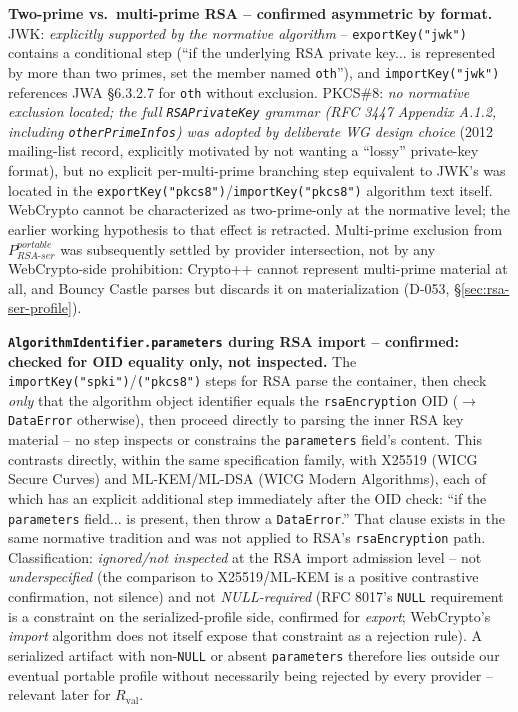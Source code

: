 \documentclass[11pt,a4paper]{article}
\begin{document}
\textbf{Two-prime vs.\ multi-prime RSA -- confirmed asymmetric by format.} JWK: \emph{explicitly supported by the normative algorithm} -- \texttt{exportKey("jwk")} contains a conditional step (``if the underlying RSA private key... is represented by more than two primes, set the member named \texttt{oth}''), and \texttt{importKey("jwk")} references JWA \S6.3.2.7 for \texttt{oth} without exclusion. PKCS\#8: \emph{no normative exclusion located; the full \texttt{RSAPrivateKey} grammar (RFC 3447 Appendix A.1.2, including \texttt{otherPrimeInfos}) was adopted by deliberate WG design choice} (2012 mailing-list record, explicitly motivated by not wanting a ``lossy'' private-key format), but no explicit per-multi-prime branching step equivalent to JWK's was located in the \texttt{exportKey("pkcs8")}/\texttt{importKey("pkcs8")} algorithm text itself. WebCrypto cannot be characterized as two-prime-only at the normative level; the earlier working hypothesis to that effect is retracted. Multi-prime exclusion from $P_{RSA\text{-}ser}^{portable}$ was subsequently settled by provider intersection, not by any WebCrypto-side prohibition: Crypto++ cannot represent multi-prime material at all, and Bouncy Castle parses but discards it on materialization (D-053, \S\ref{sec:rsa-ser-profile}).

\textbf{\texttt{AlgorithmIdentifier.parameters} during RSA import -- confirmed: checked for OID equality only, not inspected.} The \texttt{importKey("spki")}/\texttt{("pkcs8")} steps for RSA parse the container, then check \emph{only} that the algorithm object identifier equals the \texttt{rsaEncryption} OID ($\to$ \texttt{DataError} otherwise), then proceed directly to parsing the inner RSA key material -- no step inspects or constrains the \texttt{parameters} field's content. This contrasts directly, within the same specification family, with X25519 (WICG Secure Curves) and ML-KEM/ML-DSA (WICG Modern Algorithms), each of which has an explicit additional step immediately after the OID check: ``if the \texttt{parameters} field... is present, then throw a \texttt{DataError}.'' That clause exists in the same normative tradition and was not applied to RSA's \texttt{rsaEncryption} path. Classification: \emph{ignored/not inspected} at the RSA import admission level -- not \emph{underspecified} (the comparison to X25519/ML-KEM is a positive contrastive confirmation, not silence) and not \emph{NULL-required} (RFC 8017's \texttt{NULL} requirement is a constraint on the serialized-profile side, confirmed for \emph{export}; WebCrypto's \emph{import} algorithm does not itself expose that constraint as a rejection rule). A serialized artifact with non-\texttt{NULL} or absent \texttt{parameters} therefore lies outside our eventual portable profile without necessarily being rejected by every provider -- relevant later for $R_{\text{val}}$.
\end{document}
